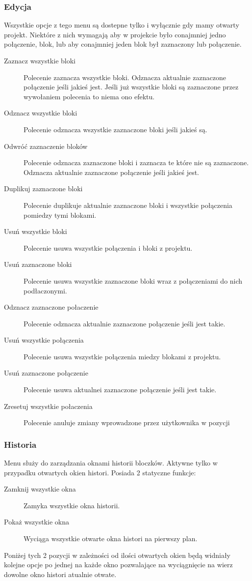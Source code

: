 \documentclass[a4paper,10pt]{article}
\begin{document}
\subsubsection{Edycja}
Wszystkie opcje z tego menu są dostepne tylko i wyłącznie gdy mamy otwarty projekt. Niektóre z nich wymagają aby w projekcie było conajmniej jedno połączenie, blok, lub aby conajmniej jeden blok był zaznaczony lub połączenie.
\begin{description}
\item[Zaznacz wszystkie bloki] Polecenie zaznacza wszystkie bloki. Odznacza aktualnie zaznaczone połączenie jeśli jakieś jest. Jeśli już wszystkie bloki są zaznaczone przez wywołaniem polecenia to niema ono efektu. 
\item[Odznacz wszystkie bloki] Polecenie odznacza wszystkie zaznaczone bloki jeśli jakieś są.
\item[Odwróć zaznaczenie bloków] Polecenie odznacza zaznaczone bloki i zaznacza te które nie są zaznaczone. Odznacza aktualnie zaznaczone połączenie jeśli jakieś jest.
\item[Duplikuj zaznaczone bloki] Polecenie duplikuje aktualnie zaznaczone bloki i wszystkie połączenia pomiedzy tymi blokami.
\item[Usuń wszystkie bloki] Polecenie usuwa wszystkie połączenia i bloki z projektu.
\item[Usuń zaznaczone bloki] Polecenie usuwa wszystkie zaznaczone bloki wraz z połączeniami do nich podłaczonymi.
\item[Odznacz zaznaczone połaczenie] Polecenie odznacza aktualnie zaznaczone połączenie jeśli jest takie.
\item[Usuń wszystkie połączenia] Polecenie usuwa wszystkie połączenia miedzy blokami z projektu.
\item[Usuń zaznaczone połączenie] Polecenie usuwa aktualnei zaznaczone połączenie jeśli jest takie.
\item[Zresetuj wszystkie połaczenia] Polecenie anuluje zmiany wprowadzone przez użytkownika w pozycji
\end{description}

\subsubsection{Historia}
Menu służy do zarządzania oknami historii bloczków. Aktywne tylko w przypadku otwartych okien histori. Posiada 2 statyczne funkcje:
\begin{description}
\item[Zamknij wszystkie okna] Zamyka wszystkie okna historii. 
\item[Pokaż wszystkie okna] Wyciąga wszystkie otwarte okna histori na pierwszy plan.
\end{description}
Poniżej tych 2 pozycji w zależności od ilości otwartych okien będą widniały kolejne opcje po jednej na każde okno pozwalające na wyciągnięcie na wierz dowolne okno histori atualnie otwate.
\end{document}
